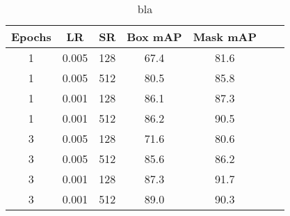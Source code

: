 \begin{table}
	\centering
	\caption[Detection evaluation]{bla}
	\label{tab:detection_eval}
	\begin{tabular}[H!]{ccccccc}
		\toprule
		\textbf{Epochs} & \textbf{LR} & \textbf{SR} & \textbf{Box mAP} & \textbf{Mask mAP} \\
		\midrule
		1               & 0.005       & 128         & 67.4             & 81.6              \\
		1               & 0.005       & 512         & 80.5             & 85.8              \\
		1               & 0.001       & 128         & 86.1             & 87.3              \\
		1               & 0.001       & 512         & 86.2             & 90.5              \\
		3               & 0.005       & 128         & 71.6             & 80.6              \\
		3               & 0.005       & 512         & 85.6             & 86.2              \\
		3               & 0.001       & 128         & 87.3             & 91.7              \\
		3               & 0.001       & 512         & 89.0             & 90.3              \\
		\bottomrule
	\end{tabular}
\end{table}